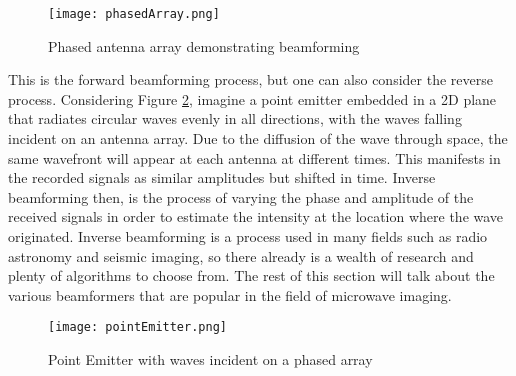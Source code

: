 \begin{figure}[!h]
    \texttt{[image: phasedArray.png]}
    \centering
    \caption{Phased antenna array demonstrating beamforming}
    \label{fig:phasedArray}
\end{figure}
\FloatBarrier This is the forward beamforming process, but one can also consider the reverse process. Considering Figure
\ref{fig:pointEmitter}, imagine a point emitter embedded in a 2D plane that radiates circular waves evenly in all
directions, with the waves falling incident on an antenna array. Due to the diffusion of the wave through space, the
same wavefront will appear at each antenna at different times. This manifests in the recorded signals as similar
amplitudes but shifted in time. Inverse beamforming then, is the process of varying the phase and amplitude of the
received signals in order to estimate the intensity at the location where the wave originated. Inverse beamforming is a
process used in many fields such as radio astronomy and seismic imaging, so there already is a wealth of research and
plenty of algorithms to choose from. The rest of this section will talk about the various beamformers that are popular
in the field of microwave imaging. \hfill \break

\begin{figure}[!h]
    \texttt{[image: pointEmitter.png]}
    \centering
    \caption{Point Emitter with waves incident on a phased array}
    \label{fig:pointEmitter}
\end{figure}
\FloatBarrier
